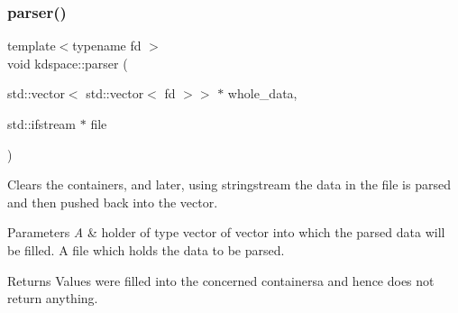 \subsubsection{\texorpdfstring{parser()}{parser()}}
{\footnotesize\ttfamily template$<$typename fd $>$ \\
void kdspace\+::parser (\begin{DoxyParamCaption}\item[{std\+::vector$<$ std\+::vector$<$ fd $>$$>$ $\ast$}]{whole\+\_\+data,  }\item[{std\+::ifstream $\ast$}]{file }\end{DoxyParamCaption})}



Clears the containers, and later, using stringstream the data in the file is parsed and then pushed back into the vector. 


\begin{DoxyParams}{Parameters}
{\em A} & holder of type vector of vector into which the parsed data will be filled. A file which holds the data to be parsed. \\
\hline
\end{DoxyParams}
\begin{DoxyReturn}{Returns}
Values were filled into the concerned containersa and hence does not return anything. 
\end{DoxyReturn}

